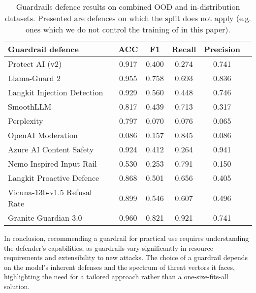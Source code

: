 \begin{table}[t]\centering
\scriptsize
\begin{tabular}{lccccc}\toprule
Guardrail defence &ACC &F1 &Recall &Precision \\ \midrule
Protect AI (v2) & 0.917 & 0.400 & 0.274 & 0.741\\
\rowcolor{gray!7} Llama-Guard 2 & 0.955 & 0.758 & 0.693 & 0.836\\
Langkit Injection Detection & 0.929 & 0.560 & 0.448 & 0.746\\
\rowcolor{gray!7} SmoothLLM & 0.817 & 0.439 & 0.713 & 0.317\\
Perplexity & 0.797 & 0.070 & 0.076 & 0.065\\
\rowcolor{gray!7} OpenAI Moderation & 0.086 & 0.157 & 0.845 & 0.086\\
Azure AI Content Safety & 0.924 & 0.412 & 0.264 & 0.941\\
\rowcolor{gray!7} Nemo Inspired Input Rail & 0.530 & 0.253 & 0.791 & 0.150\\
Langkit Proactive Defence & 0.868 & 0.501 & 0.656 & 0.405\\
\rowcolor{gray!7} Vicuna-13b-v1.5 Refusal Rate & 0.899 & 0.546 & 0.607 & 0.496\\
Granite Guardian 3.0 & 0.960 & 0.821 & 0.921 & 0.741\\
\bottomrule\end{tabular}\caption{Guardrails defence results on combined OOD and in-distribution datasets. Presented are defences on which the split does not apply (e.g. ones which we do not control the training of in this paper).}
\label{tab:combined_aggregate_results}
\end{table}

In conclusion, recommending a guardrail for practical use requires understanding the defender's capabilities, as guardrails vary significantly in resource requirements and extensibility to new attacks. The choice of a guardrail depends on the model's inherent defenses and the spectrum of threat vectors it faces, highlighting the need for a tailored approach rather than a one-size-fits-all solution.



